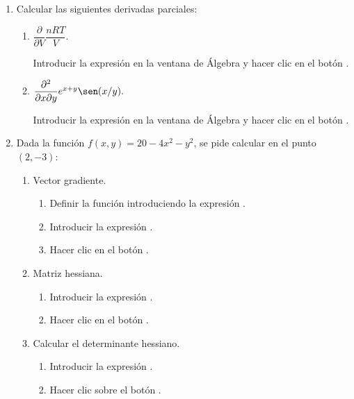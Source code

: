 \begin{enumerate}[leftmargin=*]
\item  Calcular las siguientes derivadas parciales:
\begin{enumerate}
\item  $\dfrac{\partial }{\partial V}\dfrac{nRT}{V}.$

\begin{indication}
Introducir la expresión  en la ventana de Álgebra y hacer clic en el botón .
\end{indication}

\item  $\dfrac{\partial ^{2}}{\partial x\partial y}e^{x+y}\sen(x/y).$
\begin{indication}
Introducir la expresión  en la ventana de Álgebra y hacer clic en el botón .
\end{indication}
\end{enumerate}

\item Dada la función $f(x,y)=20-4x^2-y^2$, se pide calcular en el punto $(2,-3)$:
\begin{enumerate}
\item Vector gradiente.
\begin{indication}
\begin{enumerate}
\item Definir la función introduciendo la expresión .
\item Introducir la expresión .
\item Hacer clic en el botón .
\end{enumerate}
\end{indication}

\item Matriz hessiana.
\begin{indication}
\begin{enumerate}
\item Introducir la expresión .
\item Hacer clic en el botón .
\end{enumerate}
\end{indication}

\item Calcular el determinante hessiano.
\begin{indication}
\begin{enumerate}
\item Introducir la expresión .
\item Hacer clic sobre el botón .
\end{enumerate}
\end{indication}
\end{enumerate} 



\end{enumerate}

